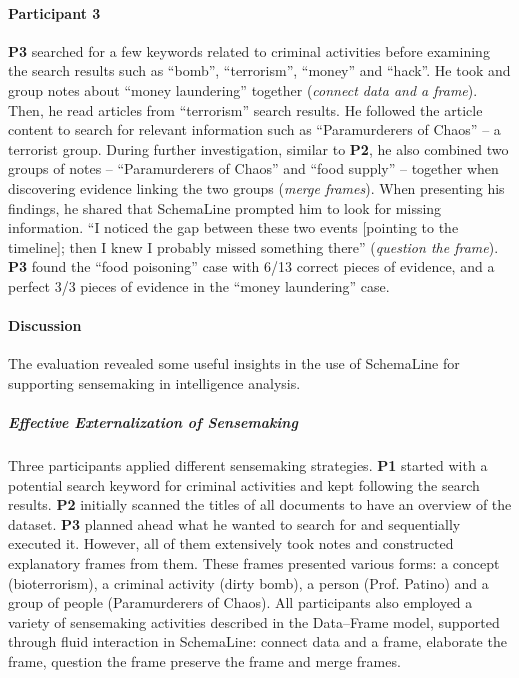 \paragraph{Participant 3}
\textbf{P3} searched for a few keywords related to criminal activities before examining the search results such as ``bomb'', ``terrorism'', ``money'' and ``hack''. He took and group notes about ``money laundering'' together (\emph{connect data and a frame}). Then, he read articles from ``terrorism'' search results. He followed the article content to search for relevant information such as ``Paramurderers of Chaos'' -- a terrorist group. During further investigation, similar to \textbf{P2}, he also combined two groups of notes -- ``Paramurderers of Chaos'' and ``food supply'' -- together when discovering evidence linking the two groups (\emph{merge frames}). When presenting his findings, he shared that SchemaLine prompted him to look for missing information. ``I noticed the gap between these two events [pointing to the timeline]; then I knew I probably missed something there'' (\emph{question the frame}). \textbf{P3} found the ``food poisoning'' case with 6/13 correct pieces of evidence, and a perfect 3/3 pieces of evidence in the ``money laundering'' case. 

\paragraph{Discussion}
The evaluation revealed some useful insights in the use of SchemaLine for supporting sensemaking in intelligence analysis.

\subparagraph{Effective Externalization of Sensemaking}
Three participants applied different sensemaking strategies. \textbf{P1} started with a potential search keyword for criminal activities and kept following the search results. \textbf{P2} initially scanned the titles of all documents to have an overview of the dataset. \textbf{P3} planned ahead what he wanted to search for and sequentially executed it. However, all of them extensively took notes and constructed explanatory frames from them. These frames presented various forms: a concept (bioterrorism), a criminal activity (dirty bomb), a person (Prof. Patino) and a group of people (Paramurderers of Chaos). All participants also employed a variety of sensemaking activities described in the Data--Frame model, supported through fluid interaction in SchemaLine: connect data and a frame, elaborate the frame, question the frame preserve the frame and merge frames.


